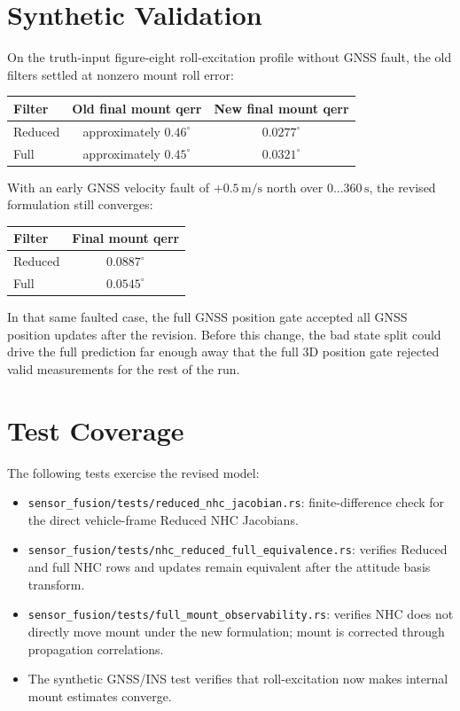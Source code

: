 \documentclass[11pt]{article}
\begin{document}
\section{Synthetic Validation}

On the truth-input figure-eight roll-excitation profile without GNSS fault, the
old filters settled at nonzero mount roll error:
\begin{center}
\begin{tabular}{lcc}
\toprule
Filter & Old final mount qerr & New final mount qerr \\
\midrule
Reduced & approximately \(0.46^\circ\) & \(0.0277^\circ\) \\
Full & approximately \(0.45^\circ\) & \(0.0321^\circ\) \\
\bottomrule
\end{tabular}
\end{center}

With an early GNSS velocity fault of \(+0.5\,\mathrm{m/s}\) north over
\(0\ldots360\,\mathrm{s}\), the revised formulation still converges:
\begin{center}
\begin{tabular}{lc}
\toprule
Filter & Final mount qerr \\
\midrule
Reduced & \(0.0887^\circ\) \\
Full & \(0.0545^\circ\) \\
\bottomrule
\end{tabular}
\end{center}
In that same faulted case, the full GNSS position gate accepted all GNSS
position updates after the revision. Before this change, the bad state split
could drive the full prediction far enough away that the full 3D position gate
rejected valid measurements for the rest of the run.

\section{Test Coverage}

The following tests exercise the revised model:
\begin{itemize}[leftmargin=*]
  \item \texttt{sensor_fusion/tests/reduced\_nhc\_jacobian.rs}: finite-difference check for
        the direct vehicle-frame Reduced NHC Jacobians.
  \item \texttt{sensor_fusion/tests/nhc\_reduced\_full\_equivalence.rs}: verifies Reduced and
        full NHC rows and updates remain equivalent after the attitude basis
        transform.
  \item \texttt{sensor_fusion/tests/full\_mount\_observability.rs}: verifies NHC does
        not directly move mount under the new formulation; mount is corrected
        through propagation correlations.
  \item The synthetic GNSS/INS test verifies that roll-excitation now makes
        internal mount estimates converge.
\end{itemize}
\end{document}
